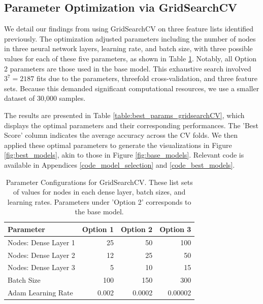 \documentclass[]{article}
\begin{document}
\clearpage

\subsection{Parameter Optimization via GridSearchCV}

We detail our findings from using GridSearchCV on three feature lists identified previously. The optimization adjusted parameters including the number of nodes in three neural network layers, learning rate, and batch size, with three possible values for each of these five parameters, as shown in Table \ref{table:gridsearchCV_params}. Notably, all Option 2 parameters are those used in the base model. This exhaustive search involved $3^7 = 2187$ fits due to the parameters, threefold cross-validation, and three feature sets. Because this demanded significant computational resources, we use a smaller dataset of 30,000 samples.

The results are presented in Table \ref{table:best_params_gridsearchCV}, which displays the optimal parameters and their corresponding performances. The 'Best Score' column indicates the average accuracy across the CV folds. We then applied these optimal parameters to generate the visualizations in Figure \ref{fig:best_models}, akin to those in Figure \ref{fig:base_models}. Relevant code is available in Appendices \ref{code_model_selection} and \ref{code_best_models}.

\begin{table}[h!]
	\centering
	\begin{tabular}{@{}lrrr@{}}
		\toprule
		Parameter            & Option 1  & Option 2  & Option 3  \\ \midrule
		Nodes: Dense Layer 1 & 25     & 50     & 100    \\
		Nodes: Dense Layer 2 & 12     & 25     & 50     \\
		Nodes: Dense Layer 3 & 5      & 10     & 15     \\
		Batch Size           & 100    & 150    & 300    \\
		Adam Learning Rate   & 0.002  & 0.0002 & 0.00002 \\
		\bottomrule   
	\end{tabular}
	\caption{Parameter Configurations for GridSearchCV. These list sets of values for nodes in each dense layer, batch sizes, and learning rates. Parameters under 'Option 2' corresponds to the base model.} 
	\label{table:gridsearchCV_params}
\end{table}
\end{document}
